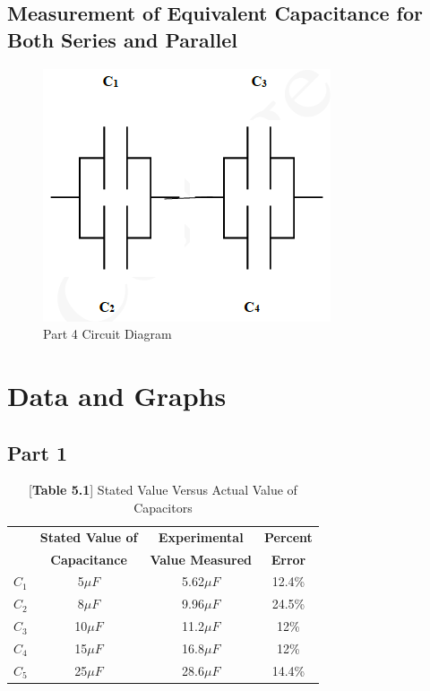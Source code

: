 \documentclass[titlepage]{article}
\begin{document}
        \FloatBarrier
        \subsection{Measurement of Equivalent Capacitance for Both Series and Parallel}
        \begin{figure}[hbt!] 
            \centering
            \caption*{Part 4 Circuit Diagram}
            \includegraphics[scale=0.5]{images/procedure/part4.png}
        \end{figure} 



	\section{Data and Graphs}
	    \subsection{Part 1}
        \FloatBarrier
		\begin{table}[hbt!]
			\centering
			\caption*{[\textbf{Table 5.1}] Stated Value Versus Actual Value of Capacitors}
			\begin{tabular}{c|c|c|c}
				&\textbf{Stated Value of} &\textbf{Experimental} &\textbf{Percent}\\
				& \textbf{Capacitance} & \textbf{Value Measured} & \textbf{Error}\\
				\hline
			$C_1$ & 5$\mu F$ & 5.62$\mu F$ & 12.4\% \\ 
			$C_2$ & 8$\mu F$ & 9.96$\mu F$ & 24.5\% \\ 
			$C_3$ & 10$\mu F$ & 11.2$\mu F$ & 12\% \\ 
			$C_4$ & 15$\mu F$ & 16.8$\mu F$ & 12\% \\ 
			$C_5$ & 25$\mu F$ & 28.6$\mu F$ & 14.4\% \\ 
			\end{tabular}
		\end{table}
        \FloatBarrier
\end{document}

